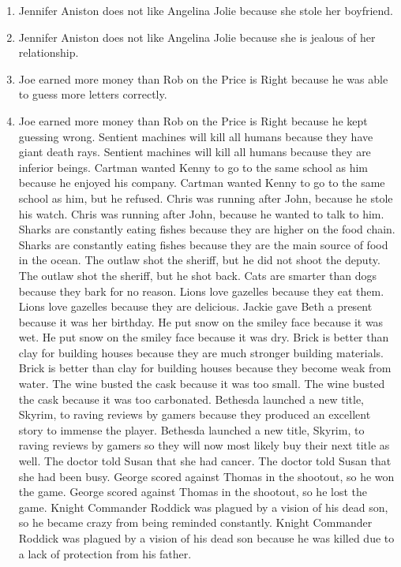 \documentclass{article}
\begin{document}
\begin{enumerate}
	\item Jennifer Aniston does not like Angelina Jolie because she stole her boyfriend.
	\item Jennifer Aniston does not like Angelina Jolie because she is jealous of her relationship.
	\item Joe earned more money than Rob on the Price is Right because he was able to guess more letters correctly.
	\item Joe earned more money than Rob on the Price is Right because he kept guessing wrong.
	Sentient machines will kill all humans because they have giant death rays.
	Sentient machines will kill all humans because they are inferior beings.
	Cartman wanted Kenny to go to the same school as him because he enjoyed his company.
	Cartman wanted Kenny to go to the same school as him, but he refused.
	Chris was running after John, because he stole his watch.
	Chris was running after John, because he wanted to talk to him.
	Sharks are constantly eating fishes because they are higher on the food chain.
	Sharks are constantly eating fishes because they are the main source of food in the ocean.
	The outlaw shot the sheriff, but he did not shoot the deputy.
	The outlaw shot the sheriff, but he shot back.
	Cats are smarter than dogs because they bark for no reason.
	Lions love gazelles because they eat them.
	Lions love gazelles because they are delicious.
	Jackie gave Beth a present because it was her birthday.
	He put snow on the smiley face because it was wet.
	He put snow on the smiley face because it was dry.
	Brick is better than clay for building houses because they are much stronger building materials.
	Brick is better than clay for building houses because they become weak from water.
	The wine busted the cask because it was too small.
	The wine busted the cask because it was too carbonated.
	Bethesda launched a new title, Skyrim, to raving reviews by gamers because they produced an excellent story to immense the player.
	Bethesda launched a new title, Skyrim, to raving reviews by gamers so they will now most likely buy their next title as well.
	The doctor told Susan that she had cancer.
	The doctor told Susan that she had been busy.
	George scored against Thomas in the shootout, so he won the game.
	George scored against Thomas in the shootout, so he lost the game.
	Knight Commander Roddick was plagued by a vision of his dead son, so he became crazy from being reminded constantly.
	Knight Commander Roddick was plagued by a vision of his dead son because he was killed due to a lack of protection from his father.

\end{enumerate}
\end{document}

